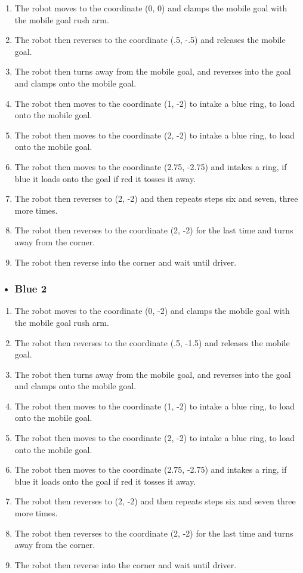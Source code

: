 \begin{enumerate}
    \item The robot moves to the coordinate (0, 0) and clamps the mobile goal with the mobile goal rush arm.
    \item The robot then reverses to the coordinate (.5, -.5) and releases the mobile goal.
    \item The robot then turns away from the mobile goal, and reverses into the goal and clamps onto the mobile goal.
    \item The robot then moves to the coordinate (1, -2) to intake a blue ring, to load onto the mobile goal.
    \item The robot then moves to the coordinate (2, -2) to intake a blue ring, to load onto the mobile goal.
    \item The robot then moves to the coordinate (2.75, -2.75) and intakes a ring, if blue it loads onto the goal if red it tosses it away.
    \item The robot then reverses to (2, -2) and then repeats steps six and seven, three more times.
    \item The robot then reverses to the coordinate (2, -2) for the last time and turns away from the corner.
    \item The robot then reverse into the corner and wait until driver.
\end{enumerate}
\begin{itemize}
    \item \subsubsection{Blue 2}
\end{itemize}
\begin{enumerate}
    \item The robot moves to the coordinate (0, -2) and clamps the mobile goal with the mobile goal rush arm.
    \item The robot then reverses to the coordinate (.5, -1.5) and releases the mobile goal.
    \item The robot then turns away from the mobile goal, and reverses into the goal and clamps onto the mobile goal.
    \item The robot then moves to the coordinate (1, -2) to intake a blue ring, to load onto the mobile goal.
    \item The robot then moves to the coordinate (2, -2) to intake a blue ring, to load onto the mobile goal.
    \item The robot then moves to the coordinate (2.75, -2.75) and intakes a ring, if blue it loads onto the goal if red it tosses it away.
    \item The robot then reverses to (2, -2) and then repeats steps six and seven three more times.
    \item The robot then reverses to the coordinate (2, -2) for the last time and turns away from the corner.
    \item The robot then reverse into the corner and wait until driver.
\end{enumerate}
